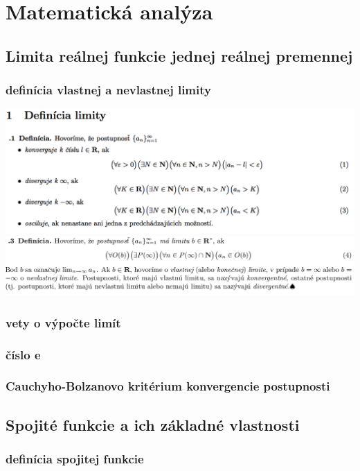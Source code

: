 \chapter[Matematická analýza]{Matematická analýza}
\label{matematicka_analyza} %

\section{Limita reálnej funkcie jednej reálnej premennej}
\subsection{definícia vlastnej a nevlastnej limity}
\includegraphics[width=1\textwidth]{images/analyza/def_lim}\\
\includegraphics[width=1\textwidth]{images/analyza/def_nev_lim}\\
\subsection{vety o výpočte limít}
\subsection{číslo e}
\subsection{Cauchyho-Bolzanovo kritérium konvergencie postupnosti}


\section{Spojité funkcie a ich základné vlastnosti}
\subsection{definícia spojitej funkcie}
